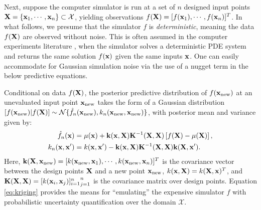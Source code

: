 \documentclass[aos,preprint]{imsart}
\theoremstyle{plain}
\newcommand{\Real}{\mathbb R}
\newcommand{\BX}{\bold X}
\newcommand{\Bx}{\bold x}
\theoremstyle{remark}
\begin{document}

Next, suppose the computer simulator is run at a set of $n$ designed input points $\BX =\{\Bx_1,\cdots,\Bx_n\}\subset \mathcal{X}$, yielding observations $f(\BX)=[f(\Bx_1),\cdots,f(\Bx_n)]^T$. In what follows, we presume that the simulator $f$ is \textit{deterministic}, meaning the data $f(\BX)$ are observed without noise. This is often assumed in the computer experiments literature \citep{santner2003}, when the simulator solves a deterministic PDE system and returns the same solution $f(\Bx)$ given the same inputs $\Bx$. One can easily accommodate for Gaussian simulation noise via the use of a nugget term \citep{peng2014choice} in the below predictive equations.

Conditional on data $f(\BX)$, the posterior predictive distribution of $f(\Bx_{\rm new})$ at an unevaluated input point $\Bx_{\rm new}$ takes the form of a Gaussian distribution $[f(\mathbf{x}_{\rm new})|f(\mathbf{X})] \sim \mathcal{N}\{\hat{f}_n(\Bx_{\rm new}),k_n(\Bx_{\rm new},\Bx_{\rm new})\}$, with posterior mean and variance given by:
\begin{align}
\begin{split}
    \hat{f}_n(\Bx)&=\mu(\Bx)+\mathbf{k}(\Bx,\BX)\mathbf{K}^{-1}(\BX,\BX)\left[f(\BX)-\mu(\BX)\right],\\
    k_n(\Bx,\Bx')&=k(\Bx,\Bx')-\mathbf{k}(\Bx,\BX)\mathbf{K}^{-1}(\BX,\BX)\mathbf{k}(\BX,\Bx').
    \end{split}
    \label{eq:kriging}
\end{align}
Here, $\mathbf{k}(\BX,\Bx_{\rm new}) = [k(\Bx_{\rm new},\Bx_1),\cdots,k(\Bx_{\rm new},\Bx_n)]^T$ is the covariance vector between the design points $\BX$ and a new point $\Bx_{\rm new}$, $k(\Bx,\BX) = k(\BX,\Bx)^T$, and $\mathbf{K}(\BX,\BX) = {{[k(\Bx_i},\Bx_j)]_{i=1}^n}_{j=1}^n$ is the covariance matrix over design points. Equation \eqref{eq:kriging} provides the means for ``emulating'' the expensive simulator $f$ with probabilistic uncertainty quantification over the domain $\mathcal{X}$.

\end{document}

